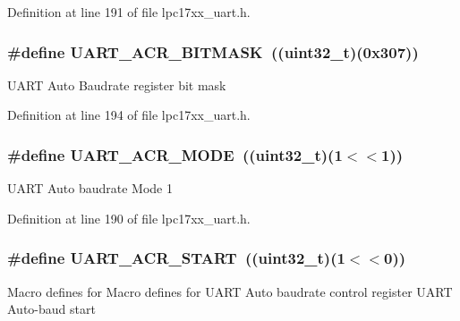 \-Definition at line 191 of file lpc17xx\-\_\-uart.\-h.

\hypertarget{group___u_a_r_t___private___macros_gae83190d58b42771ee951dfe88aada715}{
\subsubsection[{\-U\-A\-R\-T\-\_\-\-A\-C\-R\-\_\-\-B\-I\-T\-M\-A\-S\-K}]{\setlength{\rightskip}{0pt plus 5cm}\#define {\bf \-U\-A\-R\-T\-\_\-\-A\-C\-R\-\_\-\-B\-I\-T\-M\-A\-S\-K}~((uint32\-\_\-t)(0x307))}}\label{group___u_a_r_t___private___macros_gae83190d58b42771ee951dfe88aada715}
\-U\-A\-R\-T \-Auto \-Baudrate register bit mask 

\-Definition at line 194 of file lpc17xx\-\_\-uart.\-h.

\hypertarget{group___u_a_r_t___private___macros_ga706e927ee7abf7027eb88b1e13dd2a92}{
\subsubsection[{\-U\-A\-R\-T\-\_\-\-A\-C\-R\-\_\-\-M\-O\-D\-E}]{\setlength{\rightskip}{0pt plus 5cm}\#define {\bf \-U\-A\-R\-T\-\_\-\-A\-C\-R\-\_\-\-M\-O\-D\-E}~((uint32\-\_\-t)(1$<$$<$1))}}\label{group___u_a_r_t___private___macros_ga706e927ee7abf7027eb88b1e13dd2a92}
\-U\-A\-R\-T \-Auto baudrate \-Mode 1 

\-Definition at line 190 of file lpc17xx\-\_\-uart.\-h.

\hypertarget{group___u_a_r_t___private___macros_gaf6a6a4cb65edff2871ba48d3f2b445dc}{
\subsubsection[{\-U\-A\-R\-T\-\_\-\-A\-C\-R\-\_\-\-S\-T\-A\-R\-T}]{\setlength{\rightskip}{0pt plus 5cm}\#define {\bf \-U\-A\-R\-T\-\_\-\-A\-C\-R\-\_\-\-S\-T\-A\-R\-T}~((uint32\-\_\-t)(1$<$$<$0))}}\label{group___u_a_r_t___private___macros_gaf6a6a4cb65edff2871ba48d3f2b445dc}
\-Macro defines for \-Macro defines for \-U\-A\-R\-T \-Auto baudrate control register \-U\-A\-R\-T \-Auto-\/baud start 

